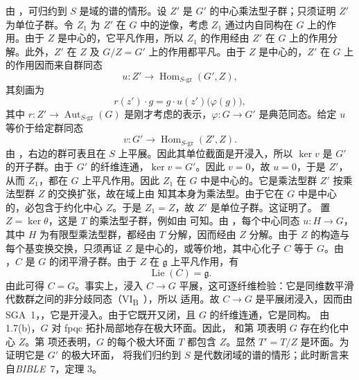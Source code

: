 由 ，可归约到 \(S\) 是域的谱的情形。设 \(Z'\) 是 \(G'\) 的中心乘法型子群；只须证明 \(Z'\) 为单位子群。令 \(Z_1\) 为 \(Z'\) 在 \(G\) 中的逆像，考虑 \(Z_1\) 通过内自同构在 \(G\) 上的作用。由于 \(Z\) 是中心的，它平凡作用，所以 \(Z_1\) 的作用经由 \(Z'\) 在 \(G\) 上的作用分解。此外，\(Z'\) 在 \(Z\) 及 \(G/Z=G'\) 上的作用都平凡。由于 \(Z\) 是中心的，\(Z'\) 在 \(G\) 上的作用因而来自群同态
\[
  u:Z'\longrightarrow
    \operatorname{Hom}_{S\text{-}\mathrm{gr}}(G',Z),
\]
其刻画为
\[
  r(z')\cdot g
    =g\cdot u(z')\bigl(\varphi(g)\bigr),
\]
其中 \(r:Z'\to\operatorname{Aut}_{S\text{-}\mathrm{gr}}(G)\) 是刚才考虑的表示，\(\varphi:G\to G'\) 是典范同态。给定 \(u\) 等价于给定群同态
\[
  v:G'\longrightarrow
    \operatorname{Hom}_{S\text{-}\mathrm{gr}}(Z',Z).
\]
由 ，右边的群可表且在 \(S\) 上平展。因此其单位截面是开浸入，所以 \(\ker v\) 是 \(G'\) 的开子群。由于 \(G'\) 的纤维连通，\(\ker v=G'\)。因此 \(v=0\)，故 \(u=0\)，于是 \(Z'\)，从而 \(Z_1\)，都在 \(G\) 上平凡作用。因此 \(Z_1\) 在 \(G\) 中是中心的。它是乘法型群 \(Z'\) 按乘法型群 \(Z\) 的交换扩张，故在域上由  知其本身为乘法型。由于它在 \(G\) 中是中心的，必包含于约化中心 \(Z\)。于是 \(Z_1=Z\)，故 \(Z'\) 是单位子群。这证明了\textup{}。
\textup{} 置 \(Z=\ker\theta\)，这是 \(T\) 的乘法型子群，例如由  可知。由 ，每个中心同态 \(u:H\to G\)，其中 \(H\) 为有限型乘法型群，都经由 \(T\) 分解，因而经由 \(Z\) 分解。由于 \(Z\) 的构造与每个基变换交换，只须再证 \(Z\) 是中心的，或等价地，其中心化子 \(C\) 等于 \(G\)。由 ，\(C\) 是 \(G\) 的闭平滑子群。由于 \(Z\) 在 \(\mathfrak g\) 上平凡作用，有
\[
  \operatorname{Lie}(C)=\mathfrak g.
\]
由此可得 \(C=G\)。事实上，浸入 \(C\to G\) 平展，这可逐纤维检验：它是同维数平滑代数群之间的非分歧同态\textup{（VI\textsubscript{B}~）}，所以  适用。故 \(C\to G\) 是平展闭浸入，因而由 SGA~1，，它是开浸入。由于它既开又闭，且 \(G\) 的纤维连通，它是同构。
\textup{} 由 1.7(b)，\(G\) 对 fpqc 拓扑局部地存在极大环面。因此， 和第\textup{} 项表明 \(G\) 存在约化中心 \(Z\)。第\textup{} 项还表明，\(G\) 的每个极大环面 \(T\) 都包含 \(Z\)。显然 \(T'=T/Z\) 是环面。为证明它是 \(G'\) 的极大环面， 将我们归约到 \(S\) 是代数闭域的谱的情形；此时断言来自\emph{BIBLE}~7，定理 3。
